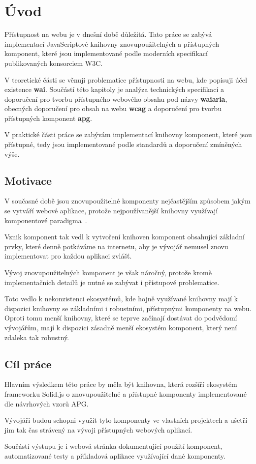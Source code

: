 \chapter{Úvod}

Přístupnost na webu je v dnešní době důležitá. Tato práce se zabývá implementací JavaScriptové knihovny
znovupoužitelných a přístupných komponent, které jsou implementované podle moderních specifikací publikovaných konsorciem W3C.

V teoretické části se věnuji problematice přístupnosti na webu, kde popisuji účel existence \textbf{\gls{wai}}.
Součástí této kapitoly je analýza technických specifikací a doporučení pro tvorbu přístupného webového obsahu
pod názvy \textbf{\gls{waiaria}}, obecných doporučení pro obsah na webu \textbf{\gls{wcag}} a doporučení pro tvorbu přístupných komponent \textbf{\gls{apg}}.

V praktické části práce se zabývám implementací knihovny komponent,
které jsou přístupné, tedy jsou implementované podle standardů a doporučení zmíněných výše.

\section{Motivace}

V současné době jsou znovupoužitelné komponenty nejčastějším způsobem jakým se vytváří webové aplikace, protože nejpoužívanější knihovny využívají komponentové paradigma~\cite{react,vue,solid,svelte}.

Vznik komponent tak vedl k vytvoření knihoven komponent obsahující základní prvky, které denně potkáváme na internetu, aby je vývojář nemusel znovu implementovat pro každou aplikaci zvlášť.

Vývoj znovupoužitelných komponent je však náročný, protože kromě implementačních detailů je nutné se zabývat i přístupové problematice.

Toto vedlo k nekonzistenci ekosystémů, kde hojně využívané knihovny mají k dispozici knihovny se základními i robustními, přístupnými komponenty na webu. Oproti tomu menší knihovny, které se teprve začínají dostávat do podvědomí vývojářům, mají k dispozici zásadně menší ekosystém komponent, který není zdaleka tak robustný.

\section{Cíl práce}

Hlavním výsledkem této práce by měla být knihovna, která rozšíří ekosystém frameworku Solid.js o znovupoužitelné a přístupné komponenty implementované dle návrhových vzorů APG.

Vývojáři budou schopni využít tyto komponenty ve vlastních projektech a ušetří jim tak čas strávený na vývoji přístupných webových aplikací.

Součástí výstupu je i webová stránka dokumentující použití komponent, automatizované testy a příkladová aplikace využívající dané komponenty.
